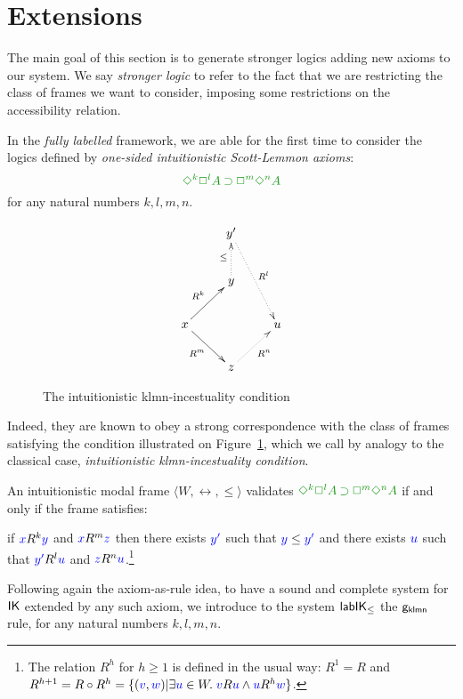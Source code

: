 \documentclass[a4paper]{article}
\begin{document}
\section{Extensions}\label{sec:ext}

The main goal of this section is to generate stronger logics adding new axioms to our system. We say \emph{stronger logic} to refer to the fact that we are restricting the class of frames we want to consider, imposing some restrictions on the accessibility relation. 

In the \emph{fully labelled} framework, we are able for the first time to consider the logics defined by \emph{one-sided intuitionistic Scott-Lemmon axioms}:
\begin{equation}
\fm{\DIA^{k} \BOX^{l} A \IMP \BOX^{m}\DIA^{n} A}
\end{equation}
for any natural numbers $k,l,m,n$.

\begin{figure}
	$$
	\xymatrix{
		& y' \ar@{.>}[ddr]^{R^l} \\
		& y \ar@{.>}[u]^{\le} \\
		x \ar@{->}[ur]^{R^k}\ar@{->}[dr]_{R^m} && u \\
		& z \ar@{.>}[ur]_{R^n}
	}
	$$
	\caption{The intuitionistic klmn-incestuality condition}
	\label{fig:gklmn}
\end{figure}

Indeed, they are known to obey a strong correspondence with the class of frames satisfying the condition illustrated on Figure~\ref{fig:gklmn}, which we call by analogy to the classical case, \emph{intuitionistic klmn-incestuality condition}.

\begin{theorem}\label{thm:gklmn-correspondence}
	An intuitionistic modal frame $\langle W, \rel, \le \rangle$ validates $\fm{\DIA^k\BOX^l A \IMP \BOX^m\DIA^n A}$ if and only if the frame satisfies:
	
	if ${\color{blue}{x}} R^{k} {\color{blue}{y}}$ and ${\color{blue}{x}} R^{m} {\color{blue}{z}}$ then there exists ${\color{blue}{y'}}$ such that ${\color{blue}{y}}\le{{\color{blue}{y'}}}$ and there exists ${\color{blue}{u}}$ such that ${\color{blue}{y'}}R^{l}{\color{blue}{u}}$ and ${\color{blue}{z}} R^{n} {\color{blue}{u}}$.\footnote{The relation $R^h$ for $h\ge1$ is defined in the usual way: $R^1=R$ and $R^{h+1}=R\circ R^h=\{({\color{blue}{v}},{\color{blue}{w}})|\exists {\color{blue}{u}}\in W.\; {\color{blue}{v}}R{\color{blue}{u}} \wedge {\color{blue}{u}}R^h{\color{blue}{w}}\}$.}
\end{theorem}

Following again the axiom-as-rule idea, to have a sound and complete system for $\mathsf{IK}$ extended by any such axiom, we introduce to the system $\mathsf{lab}\mathsf{IK}_{\le}$ the ${\mathsf{g_{klmn}}}$ rule, for any natural numbers $k,l,m,n$.
\end{document}
